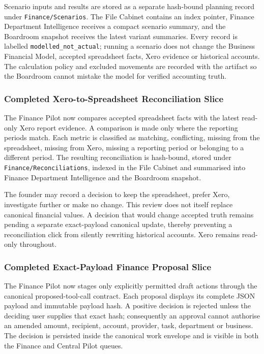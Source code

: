 Scenario inputs and results are stored as a separate hash-bound planning record under
\texttt{Finance/Scenarios}. The File Cabinet contains an index pointer, Finance Department
Intelligence receives a compact scenario summary, and the Boardroom snapshot receives the
latest variant summaries. Every record is labelled \texttt{modelled\_not\_actual}; running a
scenario does not change the Business Financial Model, accepted spreadsheet facts, Xero
evidence or historical accounts. The calculation policy and excluded movements are recorded
with the artifact so the Boardroom cannot mistake the model for verified accounting truth.

\subsubsection{Completed Xero-to-Spreadsheet Reconciliation Slice}

The Finance Pilot now compares accepted spreadsheet facts with the latest read-only Xero
report evidence. A comparison is made only where the reporting periods match. Each metric is
classified as matching, conflicting, missing from the spreadsheet, missing from Xero,
missing a reporting period or belonging to a different period. The resulting reconciliation
is hash-bound, stored under \texttt{Finance/Reconciliations}, indexed in the File Cabinet and
summarised into Finance Department Intelligence and the Boardroom snapshot.

The founder may record a decision to keep the spreadsheet, prefer Xero, investigate further
or make no change. This review does not itself replace canonical financial values. A decision
that would change accepted truth remains pending a separate exact-payload canonical update,
thereby preventing a reconciliation click from silently rewriting historical accounts. Xero
remains read-only throughout.

\subsubsection{Completed Exact-Payload Finance Proposal Slice}

The Finance Pilot now stages only explicitly permitted draft actions through the canonical
proposed-tool-call contract.  Each proposal displays its complete JSON payload and immutable
payload hash.  A positive decision is rejected unless the deciding user supplies that exact
hash; consequently an approval cannot authorise an amended amount, recipient, account,
provider, task, department or business.  The decision is persisted inside the canonical work
envelope and is visible in both the Finance and Central Pilot queues.

